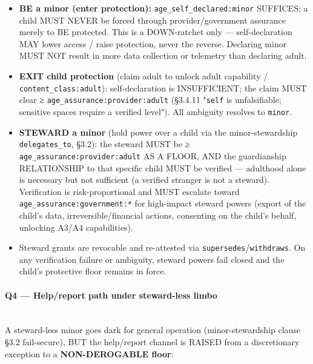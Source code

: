 \documentclass[11pt]{article}
\begin{document}
\begin{itemize}\setlength\itemsep{0pt}
\item \textbf{BE a minor (enter protection):} \texttt{age\_self\_declared:minor} SUFFICES; a child MUST NEVER be forced through provider/government assurance merely to BE protected. This is a DOWN-ratchet only — self-declaration MAY lower access / raise protection, never the reverse. Declaring minor MUST NOT result in more data collection or telemetry than declaring adult.
\item \textbf{EXIT child protection} (claim adult to unlock adult capability / \texttt{content\_class:adult}): self-declaration is INSUFFICIENT; the claim MUST clear ≥ \texttt{age\_assurance:provider:adult} (§3.4.11 "\texttt{self} is unfalsifiable; sensitive spaces require a verified level"). All ambiguity resolves to \texttt{minor}.
\item \textbf{STEWARD a minor} (hold power over a child via the minor-stewardship \texttt{delegates\_to}, §3.2): the steward MUST be ≥ \texttt{age\_assurance:provider:adult} AS A FLOOR, AND the guardianship RELATIONSHIP to that specific child MUST be verified — adulthood alone is necessary but not sufficient (a verified stranger is not a steward). Verification is risk-proportional and MUST escalate toward \texttt{age\_assurance:government:*} for high-impact steward powers (export of the child's data, irreversible/financial actions, consenting on the child's behalf, unlocking A3/A4 capabilities).
\item Steward grants are revocable and re-attested via \texttt{supersedes}/\texttt{withdraws}. On any verification failure or ambiguity, steward powers fail closed and the child's protective floor remains in force.
\end{itemize}


\paragraph{Q4 — Help/report path under steward-less limbo}\mbox{}\\


A steward-less minor goes dark for general operation (minor-stewardship clause §3.2 fail-secure), BUT the help/report channel is RAISED from a discretionary exception to a \textbf{NON-DEROGABLE floor}:
\end{document}
